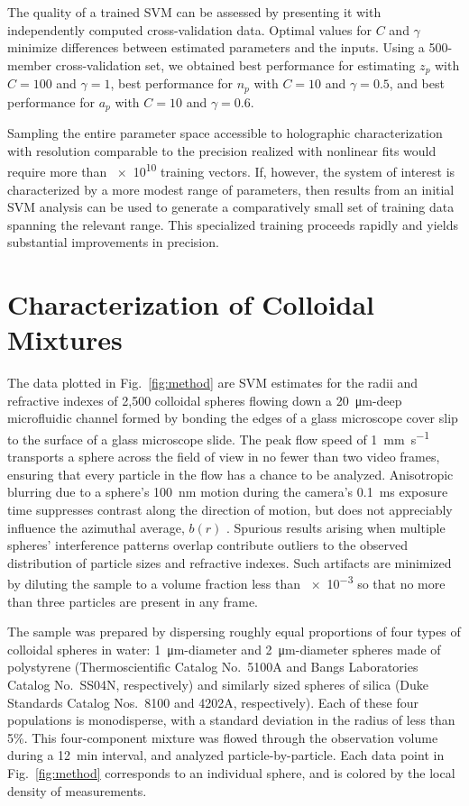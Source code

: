The quality of a trained SVM can be assessed by presenting
it with independently computed cross-validation data.
Optimal values for $C$ and $\gamma$ minimize differences
between estimated parameters and the inputs.
Using a 500-member cross-validation set, we obtained
best performance for estimating $z_p$
with $C = 100$ and $\gamma = 1$, best performance
for $n_p$ with $C = 10$ and $\gamma = 0.5$, and
best performance for $a_p$ with $C = 10$ and $\gamma = 0.6$.

Sampling the entire parameter space accessible to
holographic characterization with resolution
comparable to the precision realized with nonlinear fits
\cite{lee07a}
would require more than \num{e10} training vectors.
If, however, the system of interest is characterized by a more modest range
of parameters, then results from an initial SVM analysis
can be used to generate a comparatively small set of training data
spanning the relevant range.
This specialized training proceeds rapidly
and yields substantial improvements in precision.

\section{Characterization of Colloidal Mixtures}

The data plotted in Fig.~\ref{fig:method} are
SVM estimates for the radii and refractive indexes of 2,500 
colloidal spheres flowing down a \SI{20}{\um}-deep 
microfluidic channel formed by bonding
the edges of a glass microscope cover slip to the surface of a
glass microscope slide.
The peak flow speed of 
\SI{1}{\mm\per\second} transports  
a sphere across the field of view in no fewer than  
two video frames, ensuring that every particle in the  
flow has a chance to be analyzed.  
Anisotropic blurring due to a sphere's \SI{100}{\nm} 
motion during the camera's \SI{0.1}{\ms} exposure time  
suppresses contrast along the direction of motion, but does not  
appreciably influence the azimuthal average, $b(r)$ \cite{dixon11}.  
Spurious results arising when 
multiple spheres' interference patterns overlap
contribute outliers to the observed
distribution of particle sizes and refractive indexes.
Such artifacts are minimized by diluting the sample to a volume
fraction less than \num{e-3} so that 
no more than three particles are present in any frame.

The sample was prepared by dispersing roughly equal proportions 
of four types of colloidal spheres in water:
\SI{1}{\um}-diameter and \SI{2}{\um}-diameter 
spheres made of polystyrene (Thermoscientific Catalog No.\ 5100A and 
Bangs Laboratories Catalog No.\ SS04N, respectively) and similarly
sized spheres of silica (Duke
Standards Catalog Nos.\ 8100 and 4202A, respectively).
Each of these four populations is monodisperse, with a
standard deviation in the radius of less than 5\%.
This four-component mixture was 
flowed through the
observation volume during a \SI{12}{\minute} interval,
and analyzed particle-by-particle.
Each data point in Fig.~\ref{fig:method} corresponds to an individual 
sphere, and is colored by the local density of measurements.

